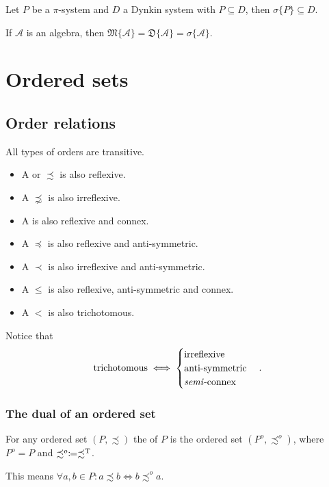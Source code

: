 \begin{corollary} \label{corollary:piLambdaTheorem}
Let $P$ be a $\pi$-system and $D$ a Dynkin system with $P\subseteq D$, then $\sigma\{P\} \subseteq D$.
\end{corollary}
\begin{corollary}
If $\mathcal{A}$ is an algebra, then $\mathfrak{M}\{\mathcal{A}\} = \mathfrak{D}\{\mathcal{A}\} = \sigma\{\mathcal{A}\}$.
\end{corollary}

\chapter{Ordered sets}
\section{Order relations}
\begin{definition}
All types of orders are transitive.
\begin{itemize}
\item A  or  $\precsim$ is also reflexive.
\item A  $\precnsim$ is also irreflexive.
\item A  is also reflexive and connex.
\item A  $\preceq$ is also reflexive and anti-symmetric.
\item A  $\prec$ is also irreflexive and anti-symmetric.
\item A  $\leq$ is also reflexive, anti-symmetric and connex.
\item A  $<$ is also trichotomous.
\end{itemize}
\end{definition}
Notice that
\[ \text{trichotomous} \iff \begin{cases}
\text{irreflexive} \\ \text{anti-symmetric} \\ \text{\textit{semi}-connex}
\end{cases}. \]

\subsection{The dual of an ordered set}
\begin{definition}
For any ordered set $(P, \precsim)$ the  of $P$ is the ordered set $(P^o, \precsim^o)$, where $P^o=P$ and $\precsim^o \coloneqq \precsim^{\mathrm{T}}$.
\end{definition}
This means $\forall a,b\in P: a\precsim b \iff b\precsim^o a$.

